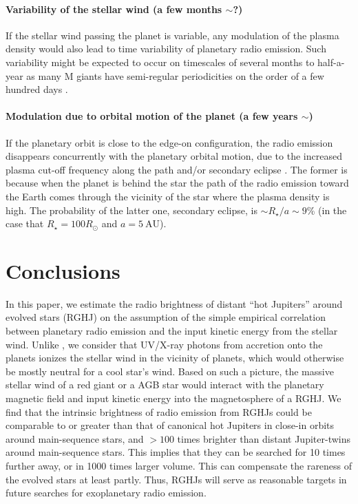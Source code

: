 \documentclass[iop,numberedappendix,apj,twocolappendix,]{emulateapj}
\begin{document}
\paragraph{Variability of the stellar wind (a few months $\sim $?)}
If the stellar wind passing the planet is variable, any modulation of the plasma density would also lead to time variability of planetary radio emission.  Such variability might be expected to occur on timescales of several months to half-a-year as many M giants have semi-regular periodicities on the order of a few hundred days \citep{Kiss:1999aa}.

%
\paragraph{Modulation due to orbital motion of the planet (a few years $\sim $)}
If the planetary orbit is close to the edge-on configuration, the radio emission disappears concurrently with the planetary orbital motion, due to the increased plasma cut-off frequency along the path and/or secondary eclipse \citep{lecavelier_et_al2013}. 
The former is because when the planet is behind the star the path of the radio emission toward the Earth comes through the vicinity of the star where the plasma density is high.
The probability of the latter one, secondary eclipse, is $\sim R_\star/a \sim 9$\% (in the case that $R_{\star}=100R_{\odot }$ and $a=5~\mathrm{AU}$). 
%


\section{Conclusions}
\label{s:conc}

In this paper, we estimate the radio brightness of distant ``hot Jupiters'' around evolved stars (RGHJ) on the assumption of the simple empirical correlation between planetary radio emission and the input kinetic energy from the stellar wind. 
Unlike \citet{ignace2010}, we consider that UV/X-ray photons from accretion onto the planets ionizes the stellar wind in the vicinity of planets, which would otherwise be mostly neutral for a cool star's wind.
Based on such a picture, the massive stellar wind of a red giant or a AGB star would interact with the planetary magnetic field and input kinetic energy into the magnetosphere of a RGHJ. 
We find that the intrinsic brightness of radio emission from RGHJs could be comparable to or greater than that of canonical hot Jupiters in close-in orbits around main-sequence stars, and $>100$ times brighter than distant Jupiter-twins around main-sequence stars.
This implies that they can be searched for 10 times further away, or in 1000 times larger volume.
This can compensate the rareness of the evolved stars at least partly.
Thus, RGHJs will serve as reasonable targets in future searches for exoplanetary radio emission. 
\end{document}
